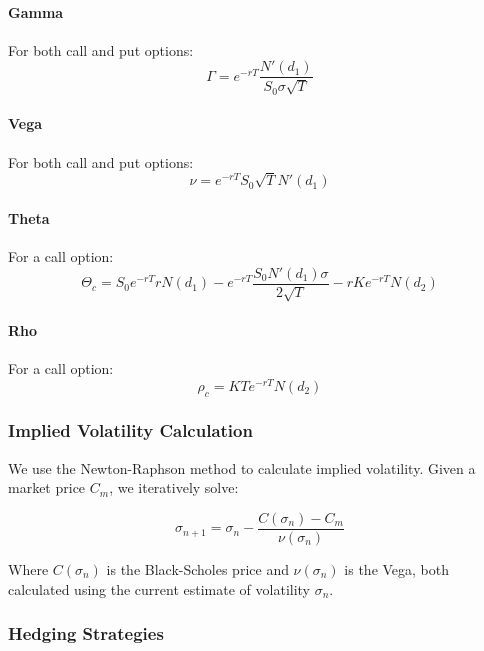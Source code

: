\documentclass[12pt]{article}
\begin{document}
\paragraph{Gamma}
For both call and put options:
\begin{equation}
    \Gamma = e^{-rT} \frac{N'(d_1)}{S_0\sigma\sqrt{T}}
\end{equation}

\paragraph{Vega}
For both call and put options:
\begin{equation}
    \nu = e^{-rT} S_0\sqrt{T}N'(d_1)
\end{equation}

\paragraph{Theta}
For a call option:
\begin{equation}
    \Theta_c = S_0 e^{-rT} r N(d_1) -e^{-rT}\frac{S_0N'(d_1)\sigma}{2\sqrt{T}} - rKe^{-rT}N(d_2)
\end{equation}

\paragraph{Rho}
For a call option:
\begin{equation}
    \rho_c = KTe^{-rT}N(d_2)
\end{equation}

\subsubsection{Implied Volatility Calculation}

We use the Newton-Raphson method to calculate implied volatility. Given a market price $C_m$, we iteratively solve:

\begin{equation}
    \sigma_{n+1} = \sigma_n - \frac{C(\sigma_n) - C_m}{\nu(\sigma_n)}
\end{equation}

Where $C(\sigma_n)$ is the Black-Scholes price and $\nu(\sigma_n)$ is the Vega, both calculated using the current estimate of volatility $\sigma_n$.

\subsubsection{Hedging Strategies}
\end{document}
